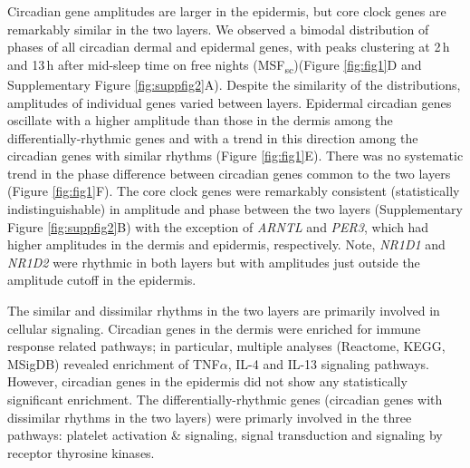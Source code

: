 Circadian gene amplitudes are larger in the epidermis, but core clock genes are remarkably similar in the two layers. We observed a bimodal distribution of phases of all circadian dermal and epidermal genes, with peaks clustering at 2\,h and 13\,h after mid-sleep time on free nights (MSF\textsubscript{sc})(Figure \ref{fig:fig1}D and Supplementary Figure \ref{fig:suppfig2}A). Despite the similarity of the distributions, amplitudes of individual genes varied between layers. Epidermal circadian genes oscillate with a higher amplitude than those in the dermis among the differentially-rhythmic genes and with a trend in this direction among the circadian genes with similar rhythms (Figure \ref{fig:fig1}E). There was no systematic trend in the phase difference between circadian genes common to the two layers (Figure \ref{fig:fig1}F). The core clock genes were remarkably consistent (statistically indistinguishable) in amplitude and phase between the two layers (Supplementary Figure \ref{fig:suppfig2}B) with the exception of \textit{ARNTL} and \textit{PER3}, which had higher amplitudes in the dermis and epidermis, respectively. Note, \textit{NR1D1} and \textit{NR1D2} were rhythmic in both layers but with amplitudes just outside the amplitude cutoff in the epidermis.

The similar and dissimilar rhythms in the two layers are primarily involved in cellular signaling. Circadian genes in the dermis were enriched for immune response related pathways; in particular, multiple analyses (Reactome, KEGG, MSigDB) revealed enrichment of TNF$\alpha$, IL-4 and IL-13 signaling pathways. However, circadian genes in the epidermis did not show any statistically significant enrichment. The differentially-rhythmic genes (circadian genes with dissimilar rhythms in the two layers) were primarly involved in the three pathways: platelet activation \& signaling, signal transduction and signaling by receptor thyrosine kinases.



